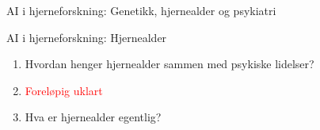 \documentclass[8pt]{beamer}
\begin{document}
	\begin{frame}{AI i hjerneforskning: Genetikk, hjernealder og psykiatri}
		\centering
	\end{frame}

	\begin{frame}{AI i hjerneforskning: Hjernealder}
		\begin{enumerate}
			\item Hvordan henger hjernealder sammen med psykiske lidelser?
			\item[ ] \textcolor{red}{Foreløpig uklart}
			\item Hva er hjernealder egentlig?
		\end{enumerate}
	\end{frame}

\end{document}
